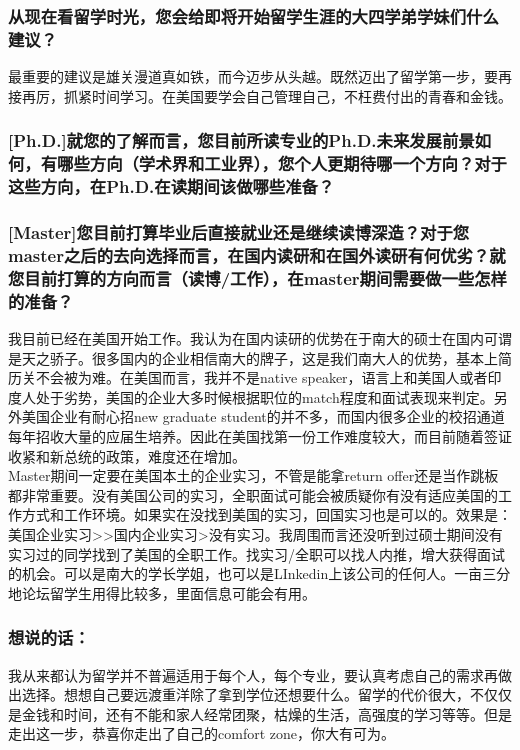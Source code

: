 \documentclass[a4paper,UTF8]{book}
\begin{document}
    \subsubsection*{从现在看留学时光，您会给即将开始留学生涯的大四学弟学妹们什么建议？}
    最重要的建议是雄关漫道真如铁，而今迈步从头越。既然迈出了留学第一步，要再接再厉，抓紧时间学习。在美国要学会自己管理自己，不枉费付出的青春和金钱。

    \subsubsection*{[Ph.D.]就您的了解而言，您目前所读专业的Ph.D.未来发展前景如何，有哪些方向（学术界和工业界），您个人更期待哪一个方向？对于这些方向，在Ph.D.在读期间该做哪些准备？}

    \subsubsection*{[Master]您目前打算毕业后直接就业还是继续读博深造？对于您master之后的去向选择而言，在国内读研和在国外读研有何优劣？就您目前打算的方向而言（读博/工作），在master期间需要做一些怎样的准备？}
    我目前已经在美国开始工作。我认为在国内读研的优势在于南大的硕士在国内可谓是天之骄子。很多国内的企业相信南大的牌子，这是我们南大人的优势，基本上简历关不会被为难。在美国而言，我并不是native speaker，语言上和美国人或者印度人处于劣势，美国的企业大多时候根据职位的match程度和面试表现来判定。另外美国企业有耐心招new graduate student的并不多，而国内很多企业的校招通道每年招收大量的应届生培养。因此在美国找第一份工作难度较大，而目前随着签证收紧和新总统的政策，难度还在增加。\\
    Master期间一定要在美国本土的企业实习，不管是能拿return offer还是当作跳板都非常重要。没有美国公司的实习，全职面试可能会被质疑你有没有适应美国的工作方式和工作环境。如果实在没找到美国的实习，回国实习也是可以的。效果是：美国企业实习>>国内企业实习>没有实习。我周围而言还没听到过硕士期间没有实习过的同学找到了美国的全职工作。找实习/全职可以找人内推，增大获得面试的机会。可以是南大的学长学姐，也可以是LInkedin上该公司的任何人。一亩三分地论坛留学生用得比较多，里面信息可能会有用。

    \subsubsection{想说的话：}
    我从来都认为留学并不普遍适用于每个人，每个专业，要认真考虑自己的需求再做出选择。想想自己要远渡重洋除了拿到学位还想要什么。留学的代价很大，不仅仅是金钱和时间，还有不能和家人经常团聚，枯燥的生活，高强度的学习等等。但是走出这一步，恭喜你走出了自己的comfort zone，你大有可为。
\end{document}
